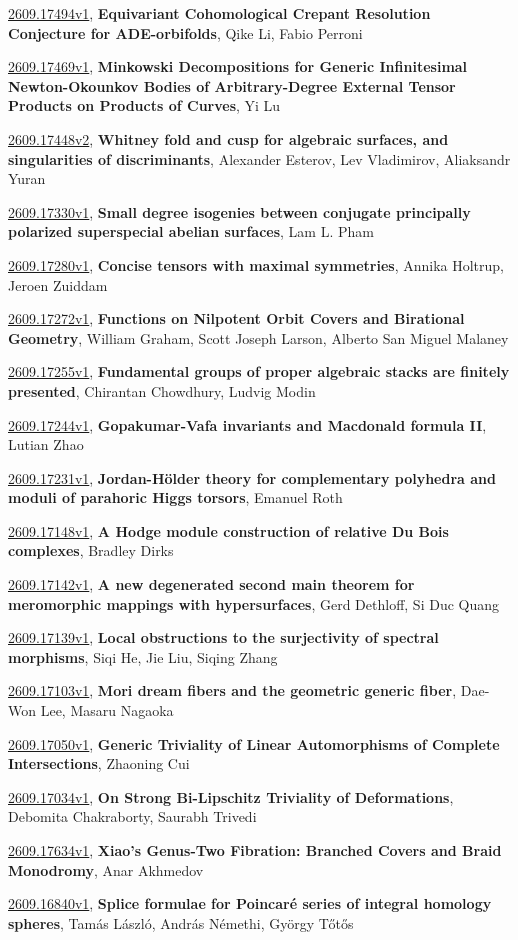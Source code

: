 \documentclass[9pt, a4paper]{article}
\theoremstyle{plain}
\theoremstyle{definition}
\theoremstyle{remark}
\newcommand{\arxiv}[3]{\href{https://arxiv.org/abs/#1}{#1}, \textbf{\textcolor{arxivblue}{#2}}, #3}
\begin{document}
\arxiv{2609.17494v1}{Equivariant Cohomological Crepant Resolution Conjecture for ADE-orbifolds}{Qike Li, Fabio Perroni}

\arxiv{2609.17469v1}{Minkowski Decompositions for Generic Infinitesimal Newton-Okounkov Bodies of Arbitrary-Degree External Tensor Products on Products of Curves}{Yi Lu}

\arxiv{2609.17448v2}{Whitney fold and cusp for algebraic surfaces, and singularities of discriminants}{Alexander Esterov, Lev Vladimirov, Aliaksandr Yuran}

\arxiv{2609.17330v1}{Small degree isogenies between conjugate principally polarized superspecial abelian surfaces}{Lam L. Pham}

\arxiv{2609.17280v1}{Concise tensors with maximal symmetries}{Annika Holtrup, Jeroen Zuiddam}

\arxiv{2609.17272v1}{Functions on Nilpotent Orbit Covers and Birational Geometry}{William Graham, Scott Joseph Larson, Alberto San Miguel Malaney}

\arxiv{2609.17255v1}{Fundamental groups of proper algebraic stacks are finitely presented}{Chirantan Chowdhury, Ludvig Modin}

\arxiv{2609.17244v1}{Gopakumar-Vafa invariants and Macdonald formula II}{Lutian Zhao}

\arxiv{2609.17231v1}{Jordan-Hölder theory for complementary polyhedra and moduli of parahoric Higgs torsors}{Emanuel Roth}

\arxiv{2609.17148v1}{A Hodge module construction of relative Du Bois complexes}{Bradley Dirks}

\arxiv{2609.17142v1}{A new degenerated second main theorem for meromorphic mappings with hypersurfaces}{Gerd Dethloff, Si Duc Quang}

\arxiv{2609.17139v1}{Local obstructions to the surjectivity of spectral morphisms}{Siqi He, Jie Liu, Siqing Zhang}

\arxiv{2609.17103v1}{Mori dream fibers and the geometric generic fiber}{Dae-Won Lee, Masaru Nagaoka}

\arxiv{2609.17050v1}{Generic Triviality of Linear Automorphisms of Complete Intersections}{Zhaoning Cui}

\arxiv{2609.17034v1}{On Strong Bi-Lipschitz Triviality of Deformations}{Debomita Chakraborty, Saurabh Trivedi}

\arxiv{2609.17634v1}{Xiao's Genus-Two Fibration: Branched Covers and Braid Monodromy}{Anar Akhmedov}

\arxiv{2609.16840v1}{Splice formulae for Poincaré series of integral homology spheres}{Tamás László, András Némethi, György Tőtős}
\end{document}
